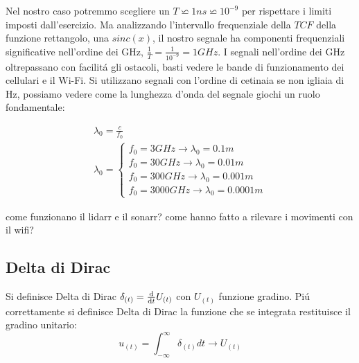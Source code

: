                 Nel nostro caso potremmo scegliere un $T\backsimeq 1ns \backsimeq 10^{-9}$ per rispettare i limiti imposti dall'esercizio.
                Ma analizzando l'intervallo frequenziale della $TCF$ della funzione rettangolo, una $sinc(x)$, il nostro segnale ha componenti
                frequenziali significative nell'ordine dei GHz, $\frac{1}{T}= \frac{1}{10^{-9}} = 1GHz$. I segnali nell'ordine dei GHz oltrepassano con facilitá
                gli ostacoli, basti vedere le bande di funzionamento dei cellulari e il Wi-Fi. Si utilizzano segnali con l'ordine di cetinaia se non igliaia di Hz, 
                possiamo vedere come la lunghezza d'onda del segnale giochi un ruolo fondamentale:
                
                \begin{gather}
                        \lambda_0 = \frac{c}{f_0} \nonumber \\
                        \lambda_0 = \begin{cases}
                            f_0 = 3GHz \rightarrow \lambda_0 = 0.1m \nonumber \\
                            f_0 = 30GHz \rightarrow \lambda_0 = 0.01m \nonumber \\
                            f_0 = 300GHz \rightarrow \lambda_0 = 0.001m \nonumber \\
                            f_0 = 3000GHz \rightarrow \lambda_0 = 0.0001m \nonumber 
                        \end{cases}\nonumber
                \end{gather}

            come funzionano il lidarr e il sonarr? come hanno fatto a rilevare i movimenti con il wifi?
    \subsection{Delta di Dirac}\label{Delta di Dirac}
        Si definisce Delta di Dirac $\delta_{(t)} = \derivative{}{t}U_{(t)}$ con $U_{(t)}$ funzione gradino.
        Piú correttamente si definisce Delta di Dirac la funzione che se integrata restituisce il gradino unitario:
        \[
            u_{(t)} = \int_{-\infty}^{\infty} \delta_{(t)} dt \rightarrow U_{(t)}
        \]

